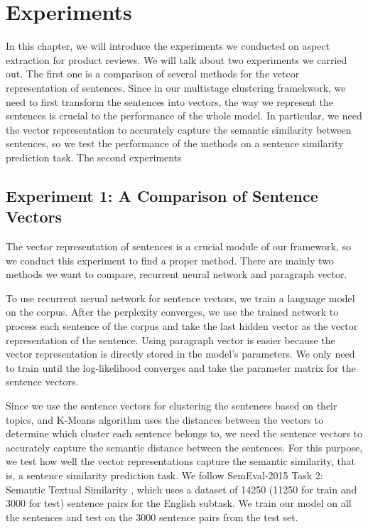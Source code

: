 \chapter{Experiments}

In this chapter, we will introduce the experiments we conducted on aspect extraction for product reviews. We will talk about two experiments we carried out. The first one is a comparison of several methods for the vetcor representation of sentences. Since in our multistage clustering framekwork, we need to first transform the sentences into vectors, the way we represent the sentences is crucial to the performance of the whole model. In particular, we need the vector representation to accurately capture the semantic similarity between sentences, so we test the performance of the methods on a sentence similarity prediction task. The second experiments

\section{Experiment 1: A Comparison of Sentence Vectors}

The vector representation of sentences is a crucial module of our framework, so we conduct this experiment to find a proper method. There are mainly two methods we want to compare, recurrent neural network and paragraph vector. 

To use recurrent nerual network for sentence vectors, we train a language model on the corpus. After the perplexity converges, we use the trained network to process each sentence of the corpus and take the last hidden vector as the vector representation of the sentence. Using paragraph vector is easier because the vector representation is directly stored in the model's parameters. We only need to train until the log-likelihood converges and take the parameter matrix for the sentence vectors.

Since we use the sentence vectors for clustering the sentences based on their topics, and K-Means algorithm uses the distances between the vectors to determine which cluster each sentence belongs to, we need the sentence vectors to accurately capture the semantic distance between the sentences. For this purpose, we test how well the vector representations capture the semantic similarity, that is, a sentence similarity prediction task. We follow SemEval-2015 Task 2: Semantic Textual Similarity \cite{agirrea2015semeval}, which uses a dataset of 14250 (11250 for train and 3000 for test) sentence pairs for the English subtask. We train our model on all the sentences and test on the 3000 sentence pairs from the test set.

